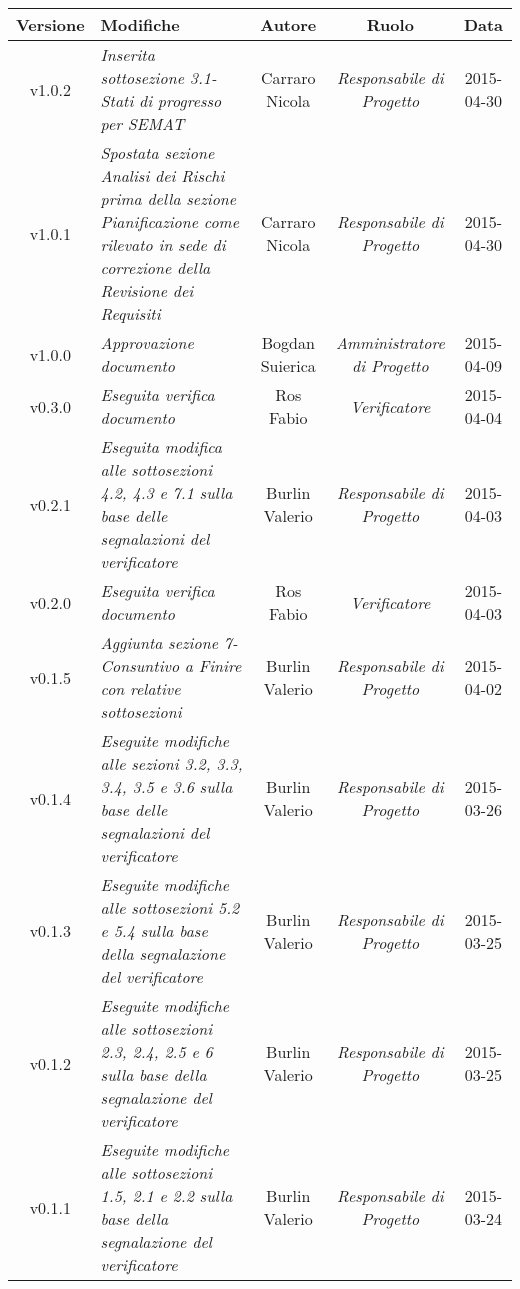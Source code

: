 \newpage

\begin{table}[h]
\centering
\begin{tabular}{|c|p{}|c|c|c|}
	\toprule
		\textbf{Versione} & \textbf{Modifiche} & \textbf{Autore} & \textbf{Ruolo} & \textbf{Data}\\
	\midrule
	\midrule
		v1.0.2 & \textit{Inserita sottosezione 3.1-Stati di progresso per SEMAT} & Carraro Nicola & \textit{Responsabile di Progetto} & 2015-04-30\\
	\midrule
		v1.0.1 & \textit{Spostata sezione Analisi dei Rischi prima della sezione Pianificazione come rilevato in sede di correzione della Revisione dei Requisiti} & Carraro Nicola & \textit{Responsabile di Progetto} & 2015-04-30\\
	\midrule
		v1.0.0 & \textit{Approvazione documento} & Bogdan Suierica & \textit{Amministratore di Progetto} & 2015-04-09\\
	\midrule
		v0.3.0 & \textit{Eseguita verifica documento} & Ros Fabio & \textit{Verificatore} & 2015-04-04\\
	\midrule
		v0.2.1 & \textit{Eseguita modifica alle sottosezioni 4.2, 4.3 e 7.1 sulla base delle segnalazioni del verificatore} & Burlin Valerio & \textit{Responsabile di Progetto} & 2015-04-03\\
	\midrule
		v0.2.0 & \textit{Eseguita verifica documento} & Ros Fabio & \textit{Verificatore} & 2015-04-03\\
	\midrule
		v0.1.5 & \textit{Aggiunta sezione 7-Consuntivo a Finire con relative sottosezioni} & Burlin Valerio & \textit{Responsabile di Progetto} & 2015-04-02\\
	\midrule
		v0.1.4 & \textit{Eseguite modifiche alle sezioni 3.2, 3.3, 3.4, 3.5 e 3.6 sulla base delle segnalazioni del verificatore} & Burlin Valerio & \textit{Responsabile di Progetto} & 2015-03-26\\
	\midrule
		v0.1.3 & \textit{Eseguite modifiche alle sottosezioni 5.2 e 5.4 sulla base della segnalazione del verificatore} & Burlin Valerio & \textit{Responsabile di Progetto} & 2015-03-25\\
	\midrule
		v0.1.2 & \textit{Eseguite modifiche alle sottosezioni 2.3, 2.4, 2.5 e 6 sulla base della segnalazione del verificatore} & Burlin Valerio & \textit{Responsabile di Progetto} & 2015-03-25\\
	\midrule
		v0.1.1 & \textit{Eseguite modifiche alle sottosezioni 1.5, 2.1 e 2.2 sulla base della segnalazione del verificatore} & Burlin Valerio & \textit{Responsabile di Progetto} & 2015-03-24\\
	\bottomrule
\end{tabular}
\end{table}

